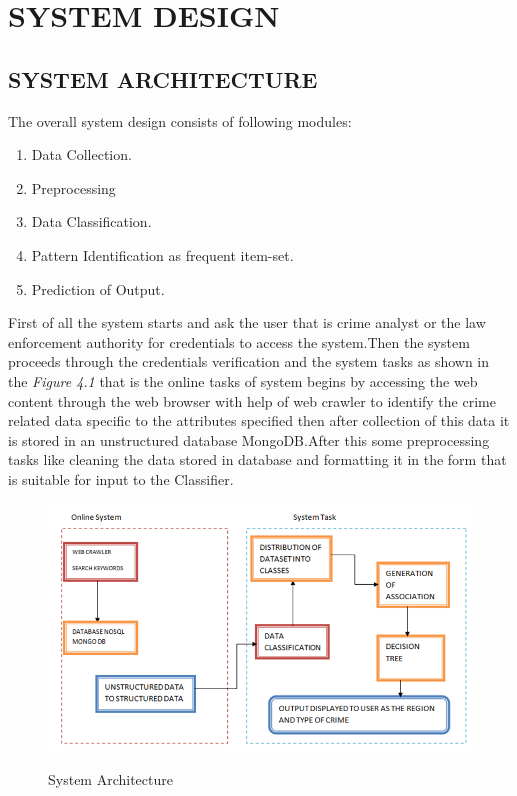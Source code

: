 \documentclass[12pt]{extreport}
\begin{document}

\chapter{SYSTEM DESIGN}

\section{SYSTEM ARCHITECTURE}
The overall system design consists of following modules:
\begin{enumerate}
\item Data Collection.
\item Preprocessing
\item Data Classification.
\item Pattern Identification as frequent item-set.
\item Prediction of Output.

\end{enumerate}
\hspace*{5em}First of all the system starts and ask the user that is crime analyst or the law enforcement authority for credentials to access the system.Then the system proceeds through the credentials verification and the system tasks as shown in the \textit{Figure 4.1} that is the online tasks of system begins by accessing the web content through the web browser with help of web crawler to identify the crime related data specific to the attributes specified then after collection of this data it is stored in an unstructured database MongoDB.After this some preprocessing tasks like cleaning the data stored in database  and formatting it in the form that is suitable for input to the Classifier.
\begin{figure}[H]


	\includegraphics[scale=0.75]{SYSARCH.png}\\
	\caption{System Architecture}
	
	\end{figure}
\end{document}
